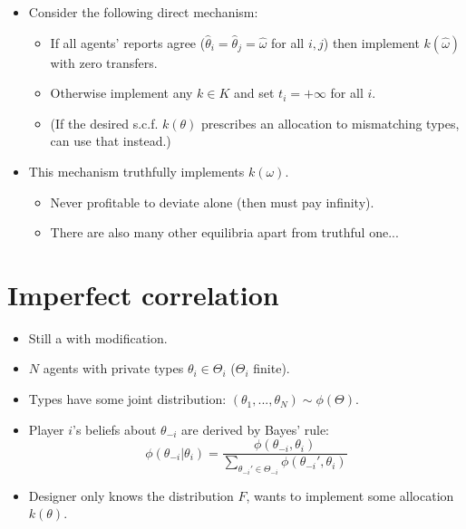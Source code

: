 \documentclass[english,handout,10pt]{beamer}		%
\def\lyxframeend{} %
\begin{document}
\begin{itemize}
	\item Consider the following direct mechanism:
	\begin{itemize}
		\item If all agents' reports agree ($\hat{\theta}_i=\hat{\theta}_j=\hat{\omega}$ for all $i,j$) then implement $k(\hat{\omega})$ with zero transfers.
		\item Otherwise implement any $k \in K$ and set $t_i = +\infty$ for all $i$.
		\item (If the desired s.c.f. $k(\theta)$ prescribes an allocation to mismatching types, can use that instead.)
	\end{itemize}
	\item This mechanism truthfully implements $k(\omega)$.
	\begin{itemize}
		\item Never profitable to deviate alone (then must pay infinity).
		\item There are also many other equilibria apart from truthful one...
	\end{itemize}
\end{itemize}
\lyxframeend


\section{Imperfect correlation}

\begin{itemize}
	\item Still a  with modification.
	\item $N$ agents with private types $\theta_i \in \Theta_i$ ($\Theta_i$ finite).
	\item Types have some joint distribution: $(\theta_1,...,\theta_N) \sim \phi(\Theta)$.
	\item Player $i$'s beliefs about $\theta_{-i}$ are derived by Bayes' rule:
		$$\phi(\theta_{-i}|\theta_i) = \frac{\phi(\theta_{-i},\theta_i)}{\sum_{\theta_{-i}' \in \Theta_{-i}} \phi(\theta_{-i}',\theta_i)} $$
	\item Designer only knows the distribution $F$, wants to implement some allocation $k(\theta)$.
\end{itemize}
\lyxframeend
\end{document}
